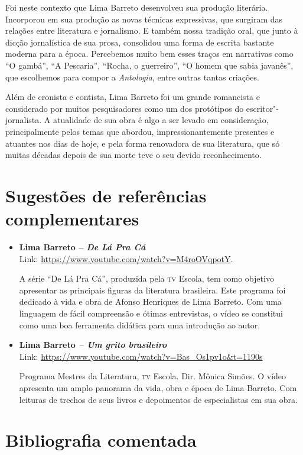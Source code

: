\documentclass[11pt]{extarticle}
\begin{document}
Foi neste contexto que Lima Barreto desenvolveu sua produção literária.
Incorporou em sua produção as novas técnicas expressivas, que surgiram
das relações entre literatura e jornalismo. E também nossa tradição
oral, que junto à dicção jornalística de sua prosa, consolidou uma forma
de escrita bastante moderna para a época. Percebemos muito bem esses
traços em narrativas como ``O gambá'', ``A
Pescaria'', ``Rocha, o guerreiro'', ``O homem
que sabia javanês'', que escolhemos para compor a \emph{Antologia},
entre outras tantas criações.

Além de cronista e contista, Lima Barreto foi um grande romancista e
considerado por muitos pesquisadores como um dos protótipos do
escritor"-jornalista. A atualidade de sua obra é algo a ser levado em
consideração, principalmente pelos temas que abordou,
impressionantemente presentes e atuantes nos dias de hoje, e pela forma
renovadora de sua literatura, que só muitas décadas depois de sua morte
teve o seu devido reconhecimento.

\section{Sugestões de referências complementares}\label{sugestoes}

\begin{itemize}
\item \textbf{Lima Barreto -- \emph{De Lá Pra Cá} }\\
Link: \url{https://www.youtube.com/watch?v=M4roOVqpotY}.

A série ``De Lá Pra Cá'', produzida pela \textsc{tv} Escola, tem como objetivo
apresentar as principais figuras da literatura brasileira. Este programa
foi dedicado à vida e obra de Afonso Henriques de Lima Barreto. Com uma
linguagem de fácil compreensão e ótimas entrevistas, o vídeo se
constitui como uma boa ferramenta didática para uma introdução ao autor.

\item \textbf{Lima Barreto \emph{-- Um grito brasileiro} }\\
Link: \url{https://www.youtube.com/watch?v=Bas_Os1pv1o\&t=1190s}

Programa Mestres da Literatura, \textsc{tv} Escola. Dir. Mônica Simões. O vídeo
apresenta um amplo panorama da vida, obra e época de Lima Barreto. Com
leituras de trechos de seus livros e depoimentos de especialistas em sua
obra.
\end{itemize}


\section{Bibliografia comentada}
\end{document}
